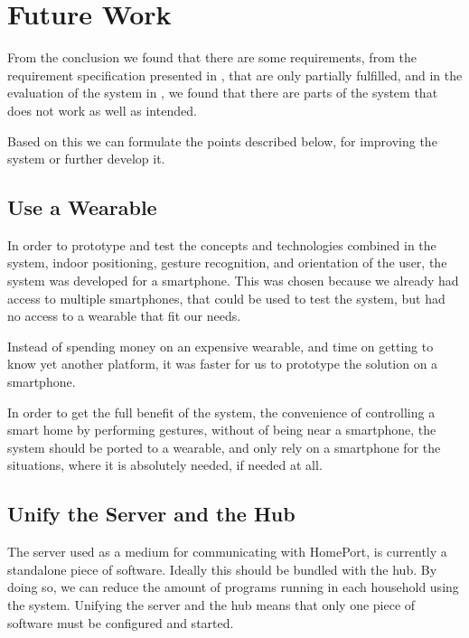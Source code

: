 \section{Future Work}\label{sec:conclusion:future-work}

From the conclusion we found that there are some requirements, 
from the requirement specification presented in , 
that are only partially fulfilled, 
and in the evaluation of the system in , 
we found that there are parts of the system that does not work as well as intended.

Based on this we can formulate the points described below, 
for improving the system or further develop it.

\subsection{Use a Wearable}

In order to prototype and test the concepts and technologies combined in the system, 
\eg indoor positioning, gesture recognition, and orientation of the user, 
the system was developed for a smartphone.
This was chosen because we already had access to multiple smartphones, 
that could be used to test the system, 
but had no access to a wearable that fit our needs.

Instead of spending money on an expensive wearable, 
and time on getting to know yet another platform, 
it was faster for us to prototype the solution on a smartphone.

In order to get the full benefit of the system, 
\ie the convenience of controlling a smart home by performing gestures, 
without of being near a smartphone, 
the system should be ported to a wearable, 
and only rely on a smartphone for the situations, 
where it is absolutely needed, if needed at all.

\subsection{Unify the Server and the Hub}

The server used as a medium for communicating with HomePort, 
is currently a standalone piece of software. 
Ideally this should be bundled with the hub. 
By doing so, we can reduce the amount of programs running in each household using the system. 
Unifying the server and the hub means that only one piece of software must be configured and started.


